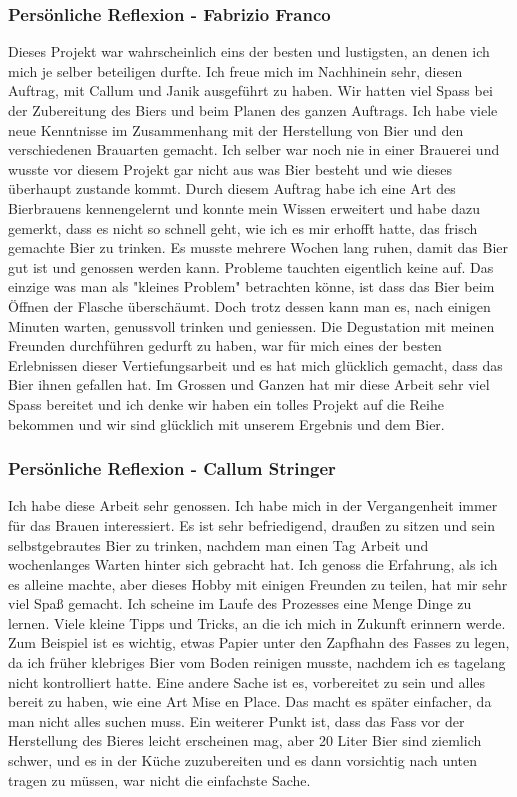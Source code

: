 \subsubsection{Persönliche Reflexion - Fabrizio Franco}
Dieses Projekt war wahrscheinlich eins der besten und lustigsten, an denen ich mich je selber beteiligen durfte. Ich freue mich im Nachhinein sehr, diesen Auftrag, mit Callum und Janik ausgeführt zu haben. Wir hatten viel Spass bei der Zubereitung des Biers und beim Planen des ganzen Auftrags. Ich habe viele neue Kenntnisse im Zusammenhang mit der Herstellung von Bier und den verschiedenen Brauarten gemacht. Ich selber war noch nie in einer Brauerei und wusste vor diesem Projekt gar nicht aus was Bier besteht und wie dieses überhaupt zustande kommt. Durch diesem Auftrag habe ich eine Art des Bierbrauens kennengelernt und konnte mein Wissen erweitert und habe dazu gemerkt, dass es nicht so schnell geht, wie ich es mir erhofft hatte, das frisch gemachte Bier zu trinken. Es musste mehrere Wochen lang ruhen, damit das Bier gut ist und genossen werden kann. Probleme tauchten eigentlich keine auf. Das einzige was man als "kleines Problem" betrachten könne, ist dass das Bier beim Öffnen der Flasche überschäumt. Doch trotz dessen kann man es, nach einigen Minuten warten, genussvoll trinken und geniessen. Die Degustation mit meinen Freunden durchführen gedurft zu haben, war für mich eines der besten Erlebnissen dieser Vertiefungsarbeit und es hat mich glücklich gemacht, dass das Bier ihnen gefallen hat. Im Grossen und Ganzen hat mir diese Arbeit sehr viel Spass bereitet und ich denke
 wir haben ein tolles Projekt auf die Reihe bekommen und wir sind glücklich mit unserem Ergebnis und dem Bier.
\subsubsection{Persönliche Reflexion - Callum Stringer}
Ich habe diese Arbeit sehr genossen. Ich habe mich in der Vergangenheit immer für das Brauen interessiert. Es ist sehr befriedigend, draußen zu sitzen und sein selbstgebrautes Bier zu trinken, nachdem man einen Tag Arbeit und wochenlanges Warten hinter sich gebracht hat.
Ich genoss die Erfahrung, als ich es alleine machte, aber dieses Hobby mit einigen Freunden zu teilen, hat mir sehr viel Spaß gemacht.
Ich scheine im Laufe des Prozesses eine Menge Dinge zu lernen. Viele kleine Tipps und Tricks, an die ich mich in Zukunft erinnern werde.
Zum Beispiel ist es wichtig, etwas Papier unter den Zapfhahn des Fasses zu legen, da ich früher klebriges Bier vom Boden reinigen musste,
nachdem ich es tagelang nicht kontrolliert hatte.
Eine andere Sache ist es, vorbereitet zu sein und alles bereit zu haben, wie eine Art Mise en Place. Das macht es später einfacher, da man
nicht alles suchen muss.
Ein weiterer Punkt ist, dass das Fass vor der Herstellung des Bieres leicht erscheinen mag, aber 20 Liter Bier sind ziemlich schwer,
und es in der Küche zuzubereiten und es dann vorsichtig nach unten tragen zu müssen, war nicht die einfachste Sache.

